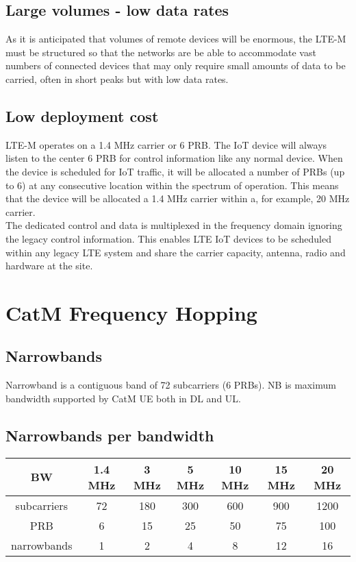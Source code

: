 \documentclass[12pt]{article}
\newcommand\tab[1][1cm]{\hspace*{#1}}
\begin{document}
\begin{description}
\subsection{Large volumes - low data rates}
 \item[\label{Large volumes - low data rates}]{
\tab As it is anticipated that volumes of remote devices will be enormous, the
LTE-M must be structured so that the networks are be able to
accommodate vast numbers of connected devices that may only require
small amounts of data to be carried, often in short peaks but with low data
rates. 
}

\subsection{Low deployment cost}
 \item[\label{Low deployment cost}]{
 \tab LTE-M operates on a 1.4 MHz carrier or 6 PRB. The IoT device will always listen to the center 6
PRB for control information like any normal device. When the device is scheduled for IoT traffic, it
will be allocated a number of PRBs (up to 6) at any consecutive location within the spectrum of
operation. This means that the device will be allocated a 1.4 MHz carrier within a, for example, 20
MHz carrier.\\
The dedicated control and data is multiplexed in the frequency domain ignoring the legacy control
information. This enables LTE IoT devices to be scheduled within any legacy LTE system and
share the carrier capacity, antenna, radio and hardware at the site. 

} 
\end{description}

\section{CatM Frequency Hopping}
\subsection{Narrowbands}
Narrowband is a contiguous band of 72 subcarriers (6 PRBs).
NB is maximum bandwidth supported by CatM UE both in DL and UL.
\subsection{Narrowbands per bandwidth}
\begin{center}
\begin{tabular}{|c|c|c|c|c|c|c|}
\hline
BW & 1.4 MHz & 3 MHz & 5 MHz & 10 MHz & 15 MHz & 20 MHz  \\
\hline 
subcarriers & 72 & 180 & 300 & 600 & 900 & 1200  \\
\hline 
PRB & 6 & 15 & 25 & 50 & 75 & 100 \\ 
\hline 
narrowbands & 1 & 2 & 4 & 8 & 12 & 16 \\
\hline 
\end{tabular} 
\end{center}
\end{document}
